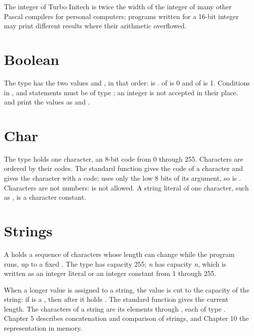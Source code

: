 The integer of Turbo Initech
is twice the width of the integer of many other Pascal compilers for
personal computers; programs written for a 16-bit integer may print
different results where their arithmetic overflowed.

\section{Boolean}
The type  has the two values  and , in that
order:  is .   of  is 0
and of  is 1.  Conditions in ,  and 
statements must be of type ; an integer is not accepted in their
place.   and  print the values as
 and .

\section{Char}
The type  holds one character, an 8-bit code from 0 through 255.
Characters are ordered by their codes.  The standard function
 gives the code of a character and  gives the
character with a code;  uses only the low 8 bits of its
argument, so  is .  Characters are not numbers:
 is not allowed.  A string literal of one character, such as
, is a character constant.

\section{Strings}
A  holds a sequence of characters whose length can change
while the program runs, up to a fixed .  The type
 has capacity 255; \code{string[}\textit{n}\code{]} has capacity
\textit{n}, which is written as an integer literal or an integer constant
from 1 through 255.

When a longer value is assigned to a string, the value is cut to the
capacity of the string: if  is a , then after
 it holds .  The standard function
 gives the current length.  The characters of a string
are its elements  through , each of type
.  Chapter 5 describes concatenation and comparison of strings, and
Chapter 10 the representation in memory.

